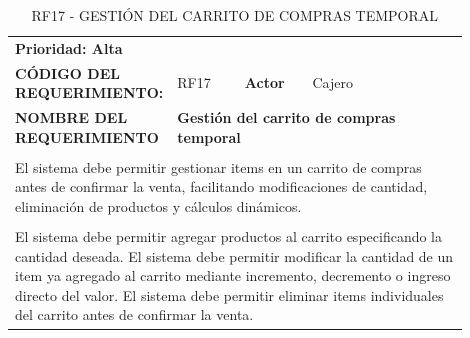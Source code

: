 \begingroup
\renewcommand{\arraystretch}{1.3}
\setlength{\tabcolsep}{6pt}
\centering
\begin{longtable}{|p{0.25\linewidth}|p{0.15\linewidth}|p{0.15\linewidth}|p{0.35\linewidth}|}
\caption{RF17 - GESTIÓN DEL CARRITO DE COMPRAS TEMPORAL}\label{tab:rf17}\\
\hline
		\rowcolor{tableheaderblue}
		\multicolumn{4}{|l|}{\textbf{Requerimientos funcionales}}                                                                                                                                \\ \hline
		\multicolumn{4}{|l|}{\textbf{Prioridad: Alta}}                                                                                                                                           \\ \hline
		\textbf{CÓDIGO DEL REQUERIMIENTO:}                          & RF17                                                                  & \cellcolor{tableheaderblue}\textbf{Actor} & Cajero \\ \hline
		\textbf{NOMBRE DEL REQUERIMIENTO}                           & \multicolumn{3}{l|}{\textbf{Gestión del carrito de compras temporal}}                                                      \\ \hline
		\rowcolor{tableheaderblue}
		\multicolumn{4}{|l|}{\textbf{Descripción}}                                                                                                                                               \\ \hline
		\multicolumn{4}{|p{0.96\linewidth}|}{%
		El sistema debe permitir gestionar items en un carrito de compras antes de confirmar la venta, facilitando modificaciones de cantidad, eliminación de productos y cálculos dinámicos.}   \\ \hline
		\rowcolor{tableheaderblue}
		\multicolumn{4}{|l|}{\textbf{Funcionalidad}}                                                                                                                                             \\ \hline
		\multicolumn{4}{|p{0.96\linewidth}|}{%
		El sistema debe permitir agregar productos al carrito especificando la cantidad deseada. \newline
		El sistema debe permitir modificar la cantidad de un item ya agregado al carrito mediante incremento, decremento o ingreso directo del valor. \newline
		El sistema debe permitir eliminar items individuales del carrito antes de confirmar la venta. \newline
}
\end{longtable}
